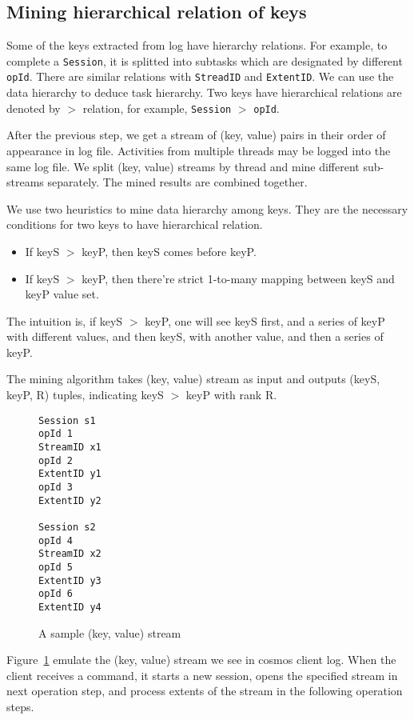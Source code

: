 \subsection{Mining hierarchical relation of keys}

Some of the keys extracted from log have hierarchy
relations. For example, to complete a \texttt{Session}, it
is splitted into subtasks which are designated by different
\texttt{opId}. There are similar relations with
\texttt{StreadID} and \texttt{ExtentID}. We can use the data
hierarchy to deduce task hierarchy. Two keys have
hierarchical relations are denoted by $>$ relation, for
example, \texttt{Session} $>$ \texttt{opId}.

After the previous step, we get a stream of (key, value)
pairs in their order of appearance in log file. Activities
from multiple threads may be logged into the same log file.
We split (key, value) streams by thread and mine different
sub-streams separately. The mined results are combined
together.

We use two heuristics to mine data hierarchy among keys.
They are the necessary conditions for two keys to have
hierarchical relation.
\begin{itemize}
\item If keyS $>$ keyP, then keyS comes before keyP.
\item If keyS $>$ keyP, then there're strict 1-to-many
mapping between keyS and keyP value set.
\end{itemize}
The intuition is, if keyS $>$ keyP, one will see keyS first,
and a series of keyP with different values, and then keyS,
with another value, and then a series of keyP.

The mining algorithm takes (key, value) stream as input and
outputs (keyS, keyP, R) tuples, indicating keyS $>$ keyP
with rank R.

\begin{figure}
\centering
\begin{verbatim}
Session s1
opId 1
StreamID x1
opId 2
ExtentID y1
opId 3
ExtentID y2

Session s2
opId 4
StreamID x2
opId 5
ExtentID y3
opId 6
ExtentID y4
\end{verbatim}
\caption{A sample (key, value) stream}
\label{fig:kvstream}
\end{figure}

Figure~\ref{fig:kvstream} emulate the (key, value) stream we
see in cosmos client log. When the client receives a
command, it starts a new session, opens the specified stream
in next operation step, and process extents of the stream in
the following operation steps.

